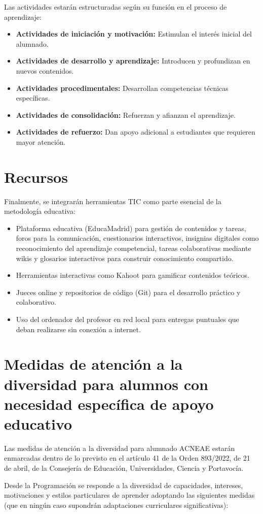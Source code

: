 Las actividades estarán estructuradas según su función en el proceso de aprendizaje:

\begin{itemize}
    \item \textbf{Actividades de iniciación y motivación:} Estimulan el interés inicial del alumnado.
    \item \textbf{Actividades de desarrollo y aprendizaje:} Introducen y profundizan en nuevos contenidos.
    \item \textbf{Actividades procedimentales:} Desarrollan competencias técnicas específicas.
    \item \textbf{Actividades de consolidación:} Refuerzan y afianzan el aprendizaje.
    \item \textbf{Actividades de refuerzo:} Dan apoyo adicional a estudiantes que requieren mayor atención.
\end{itemize}



\section{Recursos}



Finalmente, se integrarán herramientas TIC como parte esencial de la metodología educativa:

\begin{itemize}
    \item Plataforma educativa (EducaMadrid) para gestión de contenidos y tareas, foros para la comunicación, cuestionarios interactivos, insignias digitales como reconocimiento del aprendizaje competencial, tareas colaborativas mediante wikis y glosarios interactivos para construir conocimiento compartido.
    \item Herramientas interactivas como Kahoot para gamificar contenidos teóricos.
    \item Jueces online y repositorios de código (Git) para el desarrollo práctico y colaborativo.
    \item Uso del ordenador del profesor en red local para entregas puntuales que deban realizarse sin conexión a internet.
\end{itemize}





\section{Medidas de atención a la diversidad para alumnos con necesidad específica de apoyo educativo}

Las medidas de atención a la diversidad para alumnado ACNEAE estarán enmarcadas dentro de lo previsto en el artículo 41 de la Orden 893/2022, de 21 de abril, de la Consejería de Educación, Universidades, Ciencia y Portavocía.

Desde la Programación se responde a la diversidad de capacidades, intereses, motivaciones y estilos particulares de aprender adoptando las siguientes medidas (que en ningún caso supondrán adaptaciones curriculares significativas):

